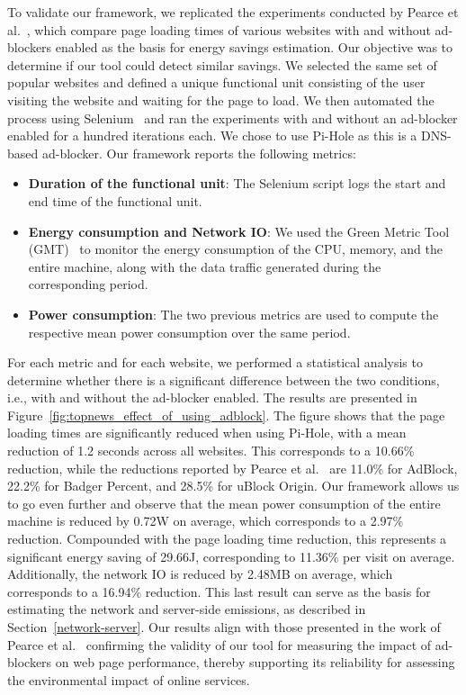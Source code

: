 \documentclass[sigconf,9pt,usenames,dvipsnames,table]{acmart}
\begin{document}
To validate our framework, we replicated the experiments conducted by Pearce et al.~\cite{pearce2020energy}, which compare page loading times of various websites with and without ad-blockers enabled as the basis for energy savings estimation. Our objective was to determine if our tool could detect similar savings. 
We selected the same set of popular websites and defined a unique functional unit consisting of the user visiting the website and waiting for the page to load. We then automated the process using Selenium~\cite{selenium} and ran the experiments with and without an ad-blocker enabled for a hundred iterations each. We chose to use Pi-Hole as this is a DNS-based ad-blocker.
Our framework reports the following metrics:
\begin{itemize}
  \item \textbf{Duration of the functional unit}: The Selenium script logs the start and end time of the functional unit.
  \item \textbf{Energy consumption and Network IO}: We used the Green Metric Tool (GMT)~\cite{greencoding} to monitor the energy consumption of the CPU, memory, and the entire machine, along with the data traffic generated during the corresponding period.
  \item \textbf{Power consumption}: The two previous metrics are used to compute the respective mean power consumption over the same period.
\end{itemize}
For each metric and for each website, we performed a statistical analysis to determine whether there is a significant difference between the two conditions, i.e., with and without the ad-blocker enabled. The results are presented in Figure~\ref{fig:topnews_effect_of_using_adblock}. The figure shows that the page loading times are significantly reduced when using Pi-Hole, with a mean reduction of 1.2 seconds across all websites. This corresponds to a 10.66\% reduction, while the reductions reported by Pearce et al.~\cite{pearce2020energy} are 11.0\% for AdBlock, 22.2\% for Badger Percent, and 28.5\% for uBlock Origin. Our framework allows us to go even further and observe that the mean power consumption of the entire machine is reduced by 0.72W on average, which corresponds to a 2.97\% reduction. Compounded with the page loading time reduction, this represents a significant energy saving of 29.66J, corresponding to 11.36\% per visit on average. Additionally, the network IO is reduced by 2.48MB on average, which corresponds to a 16.94\% reduction. This last result can serve as the basis for estimating the network and server-side emissions, as described in Section~\ref{network-server}. Our results align with those presented in the work of Pearce et al.~\cite{pearce2020energy} confirming the validity of our tool for measuring the impact of ad-blockers on web page performance, thereby supporting its reliability for assessing the environmental impact of online services.
\end{document}
